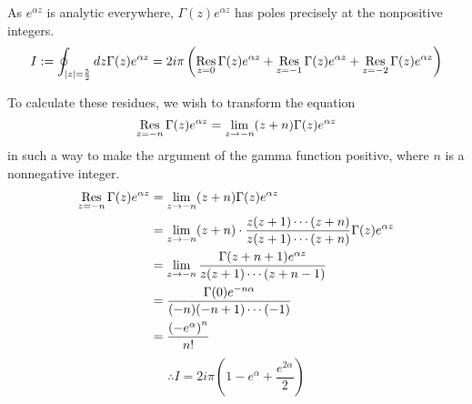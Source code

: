 \item

As $e^{\alpha z}$ is analytic everywhere, $\Gamma(z) e^{\alpha z}$ has poles precisely at the nonpositive integers.
\[
    I := \oint_{\left| z \right| = \frac{5}{2}} dz \Gamma(z) e^{\alpha z}
    = 2i\pi \left(
        \mathop{\mathrm{Res}}_{z = 0}{\Gamma(z) e^{\alpha z}}
        + \mathop{\mathrm{Res}}_{z = -1}{\Gamma(z) e^{\alpha z}}
        + \mathop{\mathrm{Res}}_{z = -2}{\Gamma(z) e^{\alpha z}}
    \right)
\]

To calculate these residues, we wish to transform the equation
\[
    \mathop{\mathrm{Res}}_{z = -n}{\Gamma(z) e^{\alpha z}}
    = \lim_{z \rightarrow -n} (z + n) \Gamma(z) e^{\alpha z}
\]
in such a way to make the argument of the gamma function positive, where $n$ is a nonnegative integer.
\begin{align*}
    \mathop{\mathrm{Res}}_{z = -n}{\Gamma(z) e^{\alpha z}}
    &= \lim_{z \rightarrow -n} (z + n) \Gamma(z) e^{\alpha z} \\
    &= \lim_{z \rightarrow -n} (z + n) \cdot \frac{z (z + 1) \cdots (z + n)}{z (z + 1) \cdots (z + n)} \Gamma(z) e^{\alpha z} \\
    &= \lim_{z \rightarrow -n} \frac{\Gamma(z + n + 1) e^{\alpha z}}{z (z + 1) \cdots (z + n - 1)} \\
    &= \frac{\Gamma(0) e^{-n \alpha}}{(-n) (-n + 1) \cdots (-1)} \\
    &= \frac{{\left( -e^\alpha \right)}^n}{n!}
\end{align*}
\[
    \therefore I
    = 2i\pi \left( 1 - e^\alpha + \frac{e^{2\alpha}}{2} \right)
\]
